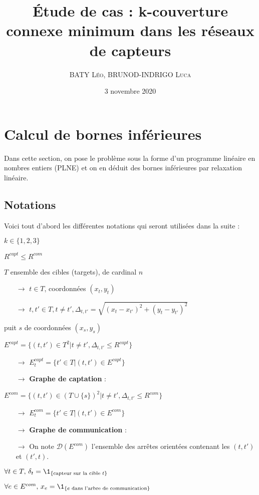 \documentclass[12pt]{article}
\title{Étude de cas : k-couverture connexe minimum dans les réseaux de capteurs}
\author{\textsc{BATY Léo}, \textsc{BRUNOD-INDRIGO Luca}}
\date{3 novembre 2020}
\begin{document}
\maketitle

\tableofcontents

\newpage

\section{Calcul de bornes inférieures}

Dans cette section, on pose le problème sous la forme d'un programme linéaire en nombres entiers (PLNE) et on en déduit des bornes inférieures par relaxation linéaire.

\subsection{Notations}

Voici tout d'abord les différentes notations qui seront utilisées dans la suite :

\begin{bulletlist}
  \item $k\in \{1, 2, 3\}$
  \item $R^{capt} \leq R^{com}$
  \item $T$ ensemble des cibles (targets), de cardinal $n$
  \begin{itemize}
    \item[$\rightarrow$] $t\in T$, coordonnées $(x_t, y_t)$
    \item[$\rightarrow$] $t, t'\in T, t\neq t', \Delta_{t, t'} = \sqrt{(x_t - x_{t'})^2 + (y_t - y_{t'})^2}$
  \end{itemize}
  \item puit $s$ de coordonnées $(x_s, y_s)$
  \item $E^{capt} = \{(t, t')\in T^2 | t\neq t', \Delta_{t, t'} \leq R^{capt}\}$
  \begin{itemize}
    \item[$\rightarrow$] $E^{capt}_t = \{t'\in T | (t, t')\in E^{capt}\}$
    \item[$\rightarrow$] \textbf{Graphe de captation} :  
  \end{itemize}
  \item $E^{com} = \{ (t, t')\in (T \cup \{ s \})^2 | t\neq t', \Delta_{t, t'} \leq R^{com} \}$
  \begin{itemize}
    \item[$\rightarrow$] $E^{com}_t = \{t'\in T | (t, t')\in E^{com}\}$
    \item[$\rightarrow$] \textbf{Graphe de communication} : 
    \item[$\rightarrow$] On note $\mathcal{D}(E^{com})$ l'ensemble des arrêtes orientées contenant les $(t, t')$ et $(t', t)$.
  \end{itemize}
  \item $\forall t\in T,\, \delta_t = \1_{\{\text{capteur sur la cible } t\}}$
  \item $\forall e\in E^{com},\, x_e = \1_{\{e \text{ dans l'arbre de communication}\}}$
\end{bulletlist}
\end{document}
